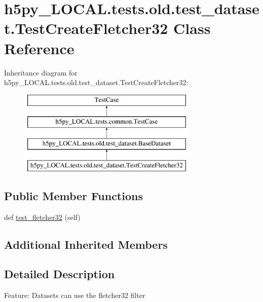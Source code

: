 \hypertarget{classh5py__LOCAL_1_1tests_1_1old_1_1test__dataset_1_1TestCreateFletcher32}{}\section{h5py\+\_\+\+L\+O\+C\+A\+L.\+tests.\+old.\+test\+\_\+dataset.\+Test\+Create\+Fletcher32 Class Reference}
\label{classh5py__LOCAL_1_1tests_1_1old_1_1test__dataset_1_1TestCreateFletcher32}
Inheritance diagram for h5py\+\_\+\+L\+O\+C\+A\+L.\+tests.\+old.\+test\+\_\+dataset.\+Test\+Create\+Fletcher32\+:\begin{figure}[H]
\begin{center}
\leavevmode
\includegraphics[height=4.000000cm]{classh5py__LOCAL_1_1tests_1_1old_1_1test__dataset_1_1TestCreateFletcher32}
\end{center}
\end{figure}
\subsection*{Public Member Functions}
\begin{DoxyCompactItemize}
\item 
def \hyperlink{classh5py__LOCAL_1_1tests_1_1old_1_1test__dataset_1_1TestCreateFletcher32_aa8fa0fcc5846921a526b58eb76e00d3c}{test\+\_\+fletcher32} (self)
\end{DoxyCompactItemize}
\subsection*{Additional Inherited Members}


\subsection{Detailed Description}
\begin{DoxyVerb}    Feature: Datasets can use the fletcher32 filter
\end{DoxyVerb}
 

